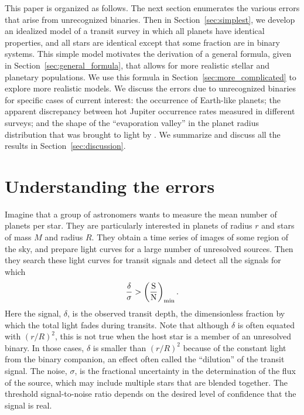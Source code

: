 \documentclass[12pt,modern,trackchanges]{aastex61}
\begin{document}
This paper is organized as follows.  The next section enumerates the
various errors that arise from unrecognized binaries.  Then in
Section~\ref{sec:simplest}, we develop an idealized model of a transit
survey in which all planets have identical properties, and all stars
are identical except that some fraction are in binary systems.  This
simple model motivates the derivation of a general formula, given in
Section~\ref{sec:general_formula}, that allows for more realistic
stellar and planetary populations.  We use this formula in
Section~\ref{sec:more_complicated} to explore more realistic models.
We discuss the errors due to unrecognized binaries for specific cases
of current interest: the occurrence of Earth-like planets; the
apparent discrepancy between hot Jupiter occurrence rates measured in
different surveys; and the shape of the ``evaporation valley'' in the
planet radius distribution that was brought to light by
\citet{fulton_california-_2017}.  We summarize and discuss all the
results in Section~\ref{sec:discussion}.


\section{Understanding the errors}
\label{sec:concept}

Imagine that a group of astronomers wants to measure the mean number
of planets per star.  They are particularly interested in planets of
radius $r$ and stars of mass $M$ and radius $R$.  They obtain a time
series of images of some region of the sky, and prepare light curves
for a large number of unresolved sources.  Then they search these
light curves for transit signals and detect all the signals for which
\begin{equation}
  \frac{\delta}{\sigma}
  >
  \left(\frac{{\rm S}}{{\rm N}}\right)_{\rm min}.
\label{eq:S_N_thresh}
\end{equation}
Here the signal, $\delta$, is the observed transit depth, the
dimensionless fraction by which the total light fades during transits.
Note that although $\delta$ is often equated with $(r/R)^2$, this is
not true when the host star is a member of an unresolved binary.  In
those cases, $\delta$ is smaller than $(r/R)^2$ because of the
constant light from the binary companion, an effect often called the
``dilution'' of the transit signal.  The noise, $\sigma$, is the
fractional uncertainty in the determination of the flux of the source,
which may include multiple stars that are blended together.  The
threshold signal-to-noise ratio depends on the desired level of
confidence that the signal is real.
\end{document}
